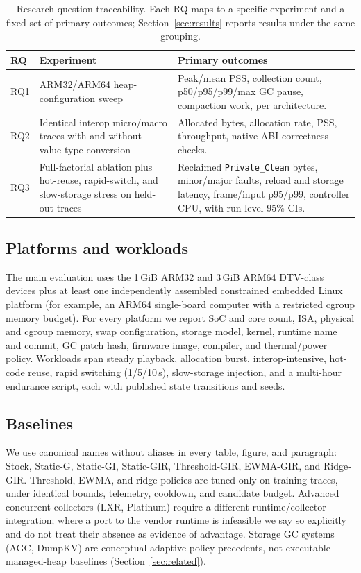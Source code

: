 \documentclass[acmsmall,screen]{acmart}
\begin{document}
\begin{table}[t]
  \caption{Research-question traceability. Each RQ maps to a specific
  experiment and a fixed set of primary outcomes; Section~\ref{sec:results}
  reports results under the same grouping.}
  \label{tab:rqmap}
  \small
  \begin{tabular}{@{}p{0.9cm}p{4.0cm}p{5.6cm}@{}}
    \toprule
    \textbf{RQ} & \textbf{Experiment} & \textbf{Primary outcomes} \\
    \midrule
    RQ1 & ARM32/ARM64 heap-configuration sweep &
    Peak/mean PSS, collection count, p50/p95/p99/max GC pause, compaction
    work, per architecture. \\
    RQ2 & Identical interop micro/macro traces with and without value-type
    conversion &
    Allocated bytes, allocation rate, PSS, throughput, native ABI
    correctness checks. \\
    RQ3 & Full-factorial ablation plus hot-reuse, rapid-switch, and
    slow-storage stress on held-out traces &
    Reclaimed \texttt{Private\_Clean} bytes, minor/major faults, reload and
    storage latency, frame/input p95/p99, controller CPU, with run-level
    95\% CIs. \\
    \bottomrule
  \end{tabular}
\end{table}

\subsection{Platforms and workloads}
The main evaluation uses the 1\,GiB ARM32 and 3\,GiB ARM64 DTV-class
devices plus at least one independently assembled constrained embedded
Linux platform (for example, an ARM64 single-board computer with a
restricted cgroup memory budget). For every platform we report SoC and core
count, ISA, physical and cgroup memory, swap configuration, storage model,
kernel, runtime name and commit, GC patch hash, firmware image, compiler,
and thermal/power policy. Workloads span steady playback, allocation burst,
interop-intensive, hot-code reuse, rapid switching (1/5/10\,s), slow-storage
injection, and a multi-hour endurance script, each with published state
transitions and seeds.

\subsection{Baselines}
We use canonical names without aliases in every table, figure, and
paragraph: \textsf{Stock}, \textsf{Static-G}, \textsf{Static-GI},
\textsf{Static-GIR}, \textsf{Threshold-GIR}, \textsf{EWMA-GIR}, and
\textsf{Ridge-GIR}. Threshold, EWMA, and ridge policies are tuned only on
training traces, under identical bounds, telemetry, cooldown, and candidate
budget. Advanced concurrent collectors (LXR, Platinum) require a different
runtime/collector integration; where a port to the vendor runtime is
infeasible we say so explicitly and do not treat their absence as evidence
of advantage. Storage GC systems (AGC, DumpKV) are conceptual
adaptive-policy precedents, not executable managed-heap baselines
(Section~\ref{sec:related}).
\end{document}
